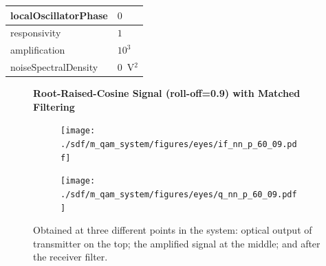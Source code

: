 \begin{refsection}
\begin{table}[H]
\begin{tabular}{|l|l|}
		localOscillatorPhase   & $0$                                                        \\ \hline
		responsivity           & $1$                                                        \\ \hline
		amplification          & $10^3$                                                     \\ \hline
		noiseSpectralDensity   & $0$~V$^2$                             					\\ \hline
	\end{tabular}
\end{table}
\begin{figure}[H]
	\centering

	\textbf{Root-Raised-Cosine Signal (roll-off=0.9) with Matched Filtering}
	\begin{minipage}{\linewidth}
		\centering
	\begin{subfigure}{.45\textwidth}
		\centering
		\texttt{[image: ./sdf/m\_qam\_system/figures/eyes/if\_nn\_p\_60\_09.pdf]}
	\end{subfigure}
	\begin{subfigure}{.45\textwidth}
		\centering
		\texttt{[image: ./sdf/m\_qam\_system/figures/eyes/q\_nn\_p\_60\_09.pdf]}
	\end{subfigure}
	\caption{
		Obtained at
		three different points in the system: optical output of transmitter on the top;
		the amplified signal at the middle; and
		after the receiver filter.
		\label{fig:eyes_nn_rrc_09}}
	\end{minipage}
	
\end{figure}


\end{refsection}
